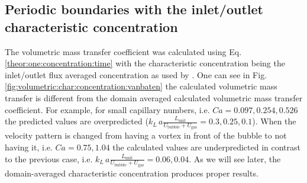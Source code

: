 \documentclass{article}
\newcommand{\vol}{k_L\,a}
\newcommand{\lunit}{L_{\mathrm{unit}}}
\newcommand{\ububble}{U_{\mathrm{bubble}}}
\newcommand{\ugas}{U_{\mathrm{gas}}}
\newcommand{\volnondim}{\vol \frac{\lunit}{\ububble+\ugas}}
\begin{document}
\subsection{Periodic boundaries with the inlet/outlet characteristic concentration}
\label{results:periodic:inlet:outlet} The volumetric mass transfer coefficient
was calculated using Eq. \ref{theor:one:concentration:time} with the
characteristic concentration being the inlet/outlet flux averaged concentration
as used by \citet{vanbaten-circular}. One can see in Fig.
\ref{fig:volumetric:char:concentration:vanbaten} the calculated volumetric mass
transfer is different from the domain averaged calculated volumetric mass
transfer coefficient. For example, for small capillary numbers, i.e.
$Ca=0.097,0.254,0.526$ the predicted values are overpredicted
($\volnondim=0.3,0.25,0.1$). When the velocity pattern is changed from having
a vortex in front of
the bubble to not having it,  i.e. $Ca=0.75,1.04$ the calculated values
are underpredicted in contrast to the previous case, i.e. $\volnondim=0.06,0.04$. As we will see later, the domain-averaged characteristic concentration produces proper results. 
\end{document}
